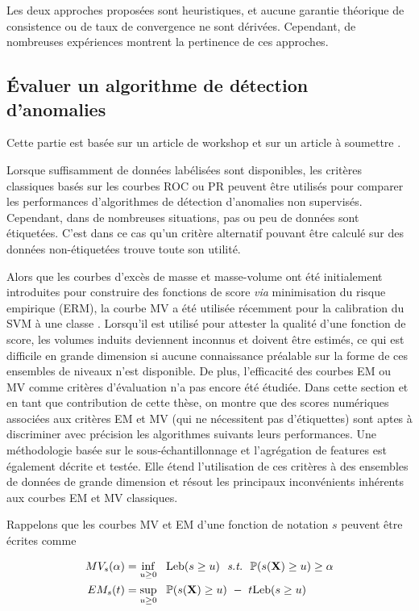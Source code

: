 \documentclass[a4paper, 12pt]{article}
\newcommand{\st}{\emph{s.t.}{}}
\def\mb{\mathbf}
\def\leb{\text{Leb}}
\begin{document}
Les deux approches proposées sont heuristiques, et aucune garantie théorique de consistence ou de taux de convergence ne sont dérivées. Cependant, de nombreuses expériences montrent la pertinence de ces approches.

\subsection{Évaluer un algorithme de détection d'anomalies}
\label{resume_fr:evaluation}
Cette partie est basée sur un article de workshop \citep{ICMLworkshop16} et sur un article à soumettre \citep{NIPS16evaluation}.


Lorsque suffisamment de données labélisées sont disponibles, les critères classiques basés sur les courbes ROC \citep{Provost1997, Provost1998, Fawcett2006} ou PR \citep{Davis2006, Clemencon2009} peuvent être utilisés pour comparer les performances d'algorithmes de détection d'anomalies non supervisés. Cependant, dans de nombreuses situations, pas ou peu de données sont étiquetées. C'est dans ce cas qu'un critère alternatif pouvant être calculé sur des données non-étiquetées trouve toute son utilité.

Alors que les courbes d'excès de masse et masse-volume ont été initialement introduites pour construire des fonctions de score \emph{via} minimisation du risque empirique (ERM), la courbe MV a été utilisée récemment pour la calibration du SVM à une classe \citep{Thomas2015}.
Lorsqu'il est utilisé pour attester la qualité d'une fonction de score, les volumes induits deviennent inconnus et doivent être estimés, ce qui est difficile en grande dimension si aucune connaissance préalable sur la forme de ces ensembles de niveaux n'est disponible.
%
De plus, l'efficacité des courbes EM ou MV comme critères d'évaluation n'a pas encore été étudiée.
%
Dans cette section et en tant que contribution de cette thèse, on montre que des scores numériques associées aux critères EM et MV (qui ne nécessitent pas d'étiquettes) sont aptes à discriminer avec précision les algorithmes suivants leurs performances.
%
Une méthodologie basée sur le sous-échantillonnage et l'agrégation de features est également décrite et testée. Elle étend l'utilisation de ces critères à des ensembles de données de grande dimension et résout les principaux inconvénients inhérents aux courbes EM et MV classiques.

Rappelons que les courbes MV et EM d'une fonction de notation $s$ peuvent être écrites comme

\begin{align}
\label{resume_fr:intro:MV-def}
 MV_s(\alpha) &= \inf_{u \ge 0}~~ \leb(s \ge u) ~~\st~~\mathbb{P}(s(\mb X) \ge u) \ge \alpha\\
\label{resume_fr:intro:EM-def}
 EM_s(t) &= \sup_{u \ge 0}~~ \mathbb{P}(s(\mb X) \ge u) ~-~ t \leb(s \ge u)
\end{align}
\end{document}
